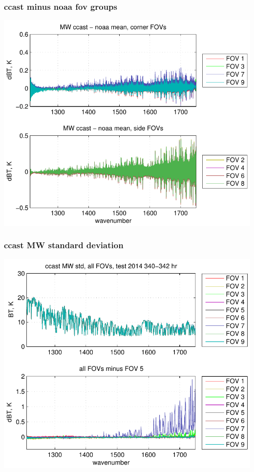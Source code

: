 \documentclass[11pt]{beamer}
\begin{document}
\begin{frame}
\frametitle{ccast minus noaa fov groups}


\begin{center}
  \includegraphics[scale=0.7]{figures/ccast_noaa_MW_fig_2.pdf}
\end{center}

\end{frame}
\begin{frame}
\frametitle{ccast MW standard deviation}

\begin{center}
  \includegraphics[scale=0.7]{figures/ccast_MW_std_2014_340-342_hr.pdf}
\end{center}

\end{frame}
\end{document}
